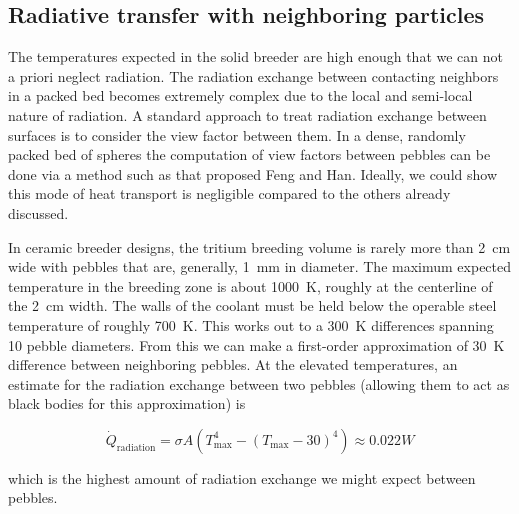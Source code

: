 



%












\subsection{Radiative transfer with neighboring particles}

The temperatures expected in the solid breeder are high enough that we can not a priori neglect radiation. The radiation exchange between contacting neighbors in a packed bed becomes extremely complex due to the local and semi-local nature of radiation. A standard approach to treat radiation exchange between surfaces is to consider the view factor between them. In a dense, randomly packed bed of spheres the computation of view factors between pebbles can be done via a method such as that proposed Feng and Han\cite{Feng2012}. Ideally, we could show this mode of heat transport is negligible compared to the others already discussed.

In ceramic breeder designs, the tritium breeding volume is rarely more than \si{2 cm} wide with pebbles that are, generally, \si{1 mm} in diameter. The maximum expected temperature in the breeding zone is about \si{1000 K}, roughly at the centerline of the \si{2 cm} width. The walls of the coolant must be held below the operable steel temperature of roughly \si{700 K}. This works out to a \si{300 K} differences spanning 10 pebble diameters. From this we can make a first-order approximation of \si{30 K} difference between neighboring pebbles. At the elevated temperatures, an estimate for the radiation exchange between two pebbles (allowing them to act as black bodies for this approximation) is

\begin{equation}
	\dot{Q}_\text{radiation} = \sigma A \left(T_\text{max}^4 - (T_\text{max}-30)^4\right) \approx 0.022\si{W}
\end{equation}
 
 which is the highest amount of radiation exchange we might expect between pebbles. 
